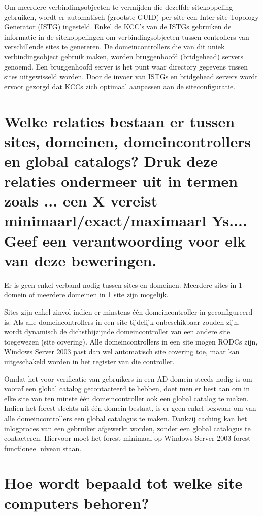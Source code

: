 Om meerdere verbindingsobjecten te vermijden die dezelfde sitekoppeling
gebruiken, wordt er automatisch (grootste GUID) per site een Inter-site Topology
Generator (ISTG) ingesteld. Enkel de KCC's van de ISTGs gebruiken de informatie
in de sitekoppelingen om verbindingsobjecten tussen controllers van
verschillende sites te genereren. De domeincontrollers die van dit uniek
verbindingsobject gebruik maken, worden bruggenhoofd (bridgehead) servers
genoemd. Een bruggenhoofd server is het punt waar directory gegevens tussen
sites uitgewisseld worden. Door de invoer van ISTGs en bridgehead servers wordt
ervoor gezorgd dat KCCs zich optimaal aanpassen aan de siteconfiguratie.

\section{Welke relaties bestaan er tussen sites, domeinen, domeincontrollers en
global catalogs? Druk deze relaties ondermeer uit in termen zoals ... een X
vereist minimaarl/exact/maximaarl Ys.... Geef een verantwoording voor elk van
deze beweringen.}

Er is geen enkel verband nodig tussen sites en domeinen. Meerdere sites in 1
domein of meerdere domeinen in 1 site zijn mogelijk.

Sites zijn enkel zinvol indien er minstens één domeincontroller in
geconfigureerd is. Als alle domeincontrollers in een site tijdelijk
onbeschikbaar zouden zijn, wordt dynamisch de dichstbijzijnde domeincontroller
van een andere site toegewezen (site covering). Alle domeincontrollers in een
site mogen RODCs zijn, Windows Server 2003 past dan wel automatisch site
covering toe, maar kan uitgeschakeld worden in het register van die controller.

Omdat het voor verificatie van gebruikers in een AD domein steeds nodig is om
vooraf een global catalog gecontacteerd te hebben, doet men er best aan om in
elke site van ten minste één domeincontroller ook een global catalog te maken.
Indien het forest slechts uit één domein bestaat, is er geen enkel bezwaar om
van alle domeincontrollers een global catalogus te maken. Dankzij caching kan
het inlogproces van een gebruiker afgewerkt worden, zonder een global catalogus
te contacteren. Hiervoor moet het forest minimaal op Windows Server 2003 forest
functioneel niveau staan.

\section{Hoe wordt bepaald tot welke site computers behoren?}

